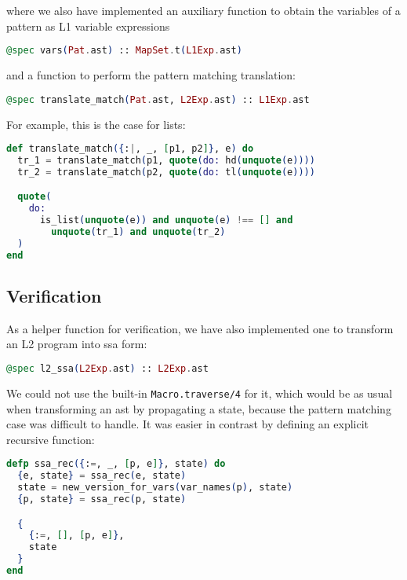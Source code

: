 where we also have implemented an auxiliary function to obtain the variables of
a pattern as L1 variable expressions

\begin{lstlisting}[language=elixir,numbers=none,frame=none]
@spec vars(Pat.ast) :: MapSet.t(L1Exp.ast)
\end{lstlisting}

and a function to perform the pattern matching translation:

\begin{lstlisting}[language=elixir,numbers=none,frame=none]
@spec translate_match(Pat.ast, L2Exp.ast) :: L1Exp.ast
\end{lstlisting}

For example, this is the case for lists:

\begin{lstlisting}[language=elixir,numbers=none,frame=none]
def translate_match({:|, _, [p1, p2]}, e) do
  tr_1 = translate_match(p1, quote(do: hd(unquote(e))))
  tr_2 = translate_match(p2, quote(do: tl(unquote(e))))

  quote(
    do:
      is_list(unquote(e)) and unquote(e) !== [] and
        unquote(tr_1) and unquote(tr_2)
  )
end
\end{lstlisting}

\subsection{Verification}

As a helper function for verification, we have also implemented one to transform
an L2 program into \gls{ssa} form:

\begin{lstlisting}[language=elixir,numbers=none,frame=none]
@spec l2_ssa(L2Exp.ast) :: L2Exp.ast
\end{lstlisting}

We could not use the built-in \verb|Macro.traverse/4| for it, which would be as
usual when transforming an \gls{ast} by propagating a state, because the pattern
matching case was difficult to handle. It was easier in contrast by defining an
explicit recursive function:

\begin{lstlisting}[language=elixir,numbers=none,frame=none]
defp ssa_rec({:=, _, [p, e]}, state) do
  {e, state} = ssa_rec(e, state)
  state = new_version_for_vars(var_names(p), state)
  {p, state} = ssa_rec(p, state)

  {
    {:=, [], [p, e]},
    state
  }
end
\end{lstlisting}

